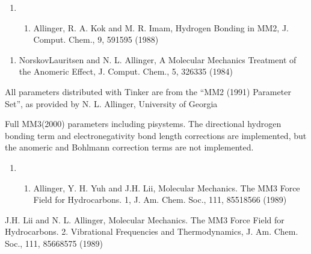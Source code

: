 \documentclass[letterpaper,11pt,english]{sphinxmanual}
\begin{document}
\begin{enumerate}
%
\setcounter{enumi}{13}
\item {} \begin{enumerate}
%
\setcounter{enumii}{11}
\item {} 
Allinger, R. A. Kok and M. R. Imam, Hydrogen Bonding in MM2, J. Comput. Chem., 9, 591\sphinxhyphen{}595 (1988)

\end{enumerate}

\end{enumerate}
\begin{enumerate}
%
\setcounter{enumi}{11}
\item {} 
Norskov\sphinxhyphen{}Lauritsen and N. L. Allinger, A Molecular Mechanics Treatment of the Anomeric Effect, J. Comput. Chem., 5, 326\sphinxhyphen{}335 (1984)

\end{enumerate}

All parameters distributed with Tinker are from the “MM2 (1991) Parameter Set”, as provided by N. L. Allinger, University of Georgia


Full MM3(2000) parameters including pi\sphinxhyphen{}systems. The directional hydrogen bonding term and electronegativity bond length corrections are implemented, but the anomeric and Bohlmann correction terms are not implemented.
\begin{enumerate}
%
\setcounter{enumi}{13}
\item {} \begin{enumerate}
%
\setcounter{enumii}{11}
\item {} 
Allinger, Y. H. Yuh and J.\sphinxhyphen{}H. Lii, Molecular Mechanics. The MM3 Force Field for Hydrocarbons. 1, J. Am. Chem. Soc., 111, 8551\sphinxhyphen{}8566 (1989)

\end{enumerate}

\end{enumerate}

J.\sphinxhyphen{}H. Lii and N. L. Allinger, Molecular Mechanics. The MM3 Force Field for Hydrocarbons. 2. Vibrational Frequencies and Thermodynamics, J. Am. Chem. Soc., 111, 8566\sphinxhyphen{}8575 (1989)
\end{document}
